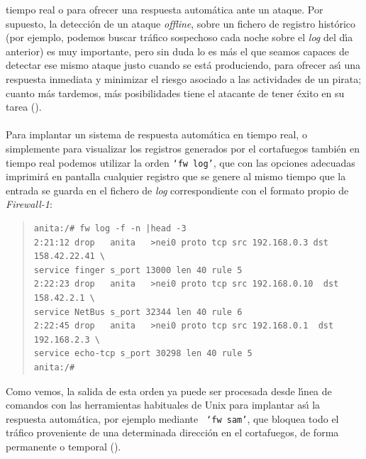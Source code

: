 tiempo real o para ofrecer una respuesta autom\'atica ante un ataque. Por
supuesto, la detecci\'on de un ataque {\it offline}, sobre un fichero de
registro hist\'orico (por ejemplo, podemos buscar tr\'afico sospechoso cada 
noche sobre el {\it log} del d\'{\i}a anterior) es muy importante, pero sin
duda lo es m\'as el que seamos capaces de detectar ese mismo ataque justo
cuando se est\'a produciendo, para ofrecer as\'{\i} una respuesta inmediata y
minimizar el riesgo asociado a las actividades de un pirata; cuanto m\'as
tardemos, m\'as posibilidades tiene el atacante de tener \'exito en su tarea
(\cite{kn:coh99}).\\
\\Para implantar un sistema de respuesta autom\'atica en tiempo real, o 
simplemente para visualizar los registros generados por el cortafuegos tambi\'en
en tiempo real podemos utilizar la orden {\tt `fw log'}, que con las opciones
adecuadas imprimir\'a en pantalla cualquier registro que se genere al mismo 
tiempo que la entrada se guarda en el fichero de {\it log} correspondiente con 
el formato propio de {\it Firewall-1}:
\begin{quote}
\begin{verbatim}
anita:/# fw log -f -n |head -3
2:21:12 drop   anita   >nei0 proto tcp src 192.168.0.3 dst 158.42.22.41 \
service finger s_port 13000 len 40 rule 5 
2:22:23 drop   anita   >nei0 proto tcp src 192.168.0.10  dst 158.42.2.1 \
service NetBus s_port 32344 len 40 rule 6 
2:22:45 drop   anita   >nei0 proto tcp src 192.168.0.1  dst 192.168.2.3 \
service echo-tcp s_port 30298 len 40 rule 5
anita:/#
\end{verbatim}
\end{quote}
Como vemos, la salida de esta orden ya puede ser
procesada desde l\'{\i}nea de comandos con las herramientas habituales de Unix
para implantar as\'{\i} la respuesta autom\'atica, por ejemplo mediante {\tt
`fw sam'}, que bloquea todo el tr\'afico proveniente de una determinada 
direcci\'on en el cortafuegos, de forma permanente o temporal 
(\cite{kn:spi01b}). 
